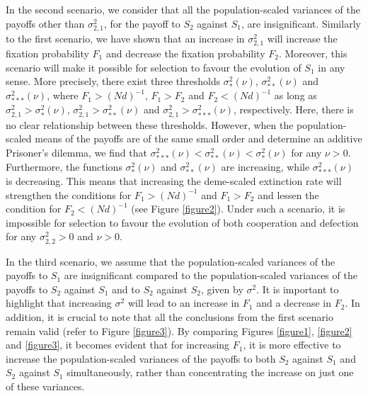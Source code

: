 \documentclass[11pt]{article}
\begin{document}
 
In the second scenario, we consider that all the population-scaled variances of the payoffs other than $\sigma_{2,1}^2$, for the payoff to $S_2$ against $S_1$, are insignificant.  Similarly to the first scenario, we have shown that an increase in $\sigma_{2,1}^2$ will increase the fixation probability $F_1$ and decrease the fixation probability $F_2$. Moreover, this scenario will make it possible for selection to favour the evolution of $S_1$ in any sense. More precisely, there exist three thresholds $\sigma^2_{*}(\nu)$, $\sigma^2_{**}(\nu)$ and $\sigma^2_{***}(\nu)$, where
$F_1 > (Nd)^{-1}$, $F_1>F_2$ and $F_2<(Nd)^{-1}$ as long as $\sigma_{2,1}^2>\sigma^2_{*}(\nu)$, $\sigma_{2,1}^2>\sigma^2_{**}(\nu)$ and $\sigma_{2,1}^2>\sigma^2_{***}(\nu)$, respectively. Here, there is no clear relationship between these thresholds. However, when the population-scaled means of the payoffs are of the same small order and determine an additive Prisoner's dilemma, we find that $\sigma^2_{***}(\nu)<\sigma^2_{**}(\nu)<\sigma^2_{*}(\nu)$ for any  $\nu>0$. Furthermore, the functions
$\sigma^2_{*}(\nu)$ and $\sigma^2_{**}(\nu)$ are increasing, while $\sigma^2_{***}(\nu)$ is decreasing. This means that increasing the deme-scaled extinction rate will strengthen the conditions for $F_1>(Nd)^{-1}$ and $F_1>F_2$ and lessen the condition for $F_2<(Nd)^{-1}$ (see Figure \ref{figure2}). Under such a scenario, it is impossible for selection to favour the evolution of both cooperation and defection for any $\sigma_{2,2}^2>0$ and $\nu>0$.

 
In the third scenario, we assume that the population-scaled variances of the payoffs to $S_1$ are insignificant compared to the population-scaled variances of the payoffs to $S_2$ against $S_1$ and to $S_2$ against $S_2$, given by $\sigma^2$. It is important to highlight that increasing $\sigma^2$ will lead to an increase in $F_1$ and a decrease in $F_2$. In addition, it is crucial to note that all the conclusions from the first scenario remain valid (refer to Figure \ref{figure3}). By comparing Figures \ref{figure1}, \ref{figure2} and \ref{figure3}, it becomes evident that for increasing $F_1$, it is more effective to increase the population-scaled variances of the payoffs to both $S_2$ against $S_1$ and $S_2$ against $S_1$ simultaneously, rather than concentrating the increase on just one of these variances.
\end{document}
